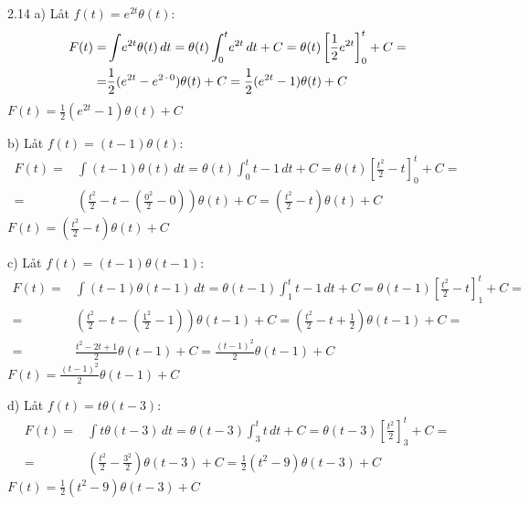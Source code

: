 \begin{task}{2.14 a)}
	Låt $f(t)=e^{2t}\theta(t)$:
	\begin{align*}
	F(t)=
	&\int \! e^{2t}\theta(t) \, dt=
	\theta(t)\int_{0}^{t} \! e^{2t} \, dt+C=
	\theta(t)\left[\frac{1}{2}e^{2t}\right]_{0}^{t}+C= \\ =
	&\frac{1}{2}(e^{2t}-e^{2\operatorname{\cdot}0})\theta(t)+C=
	\frac{1}{2}(e^{2t}-1)\theta(t)+C
	\end{align*}
	\ans $F(t)=\frac{1}{2}(e^{2t}-1)\theta(t)+C$
\end{task}

\begin{task}{b)}
	Låt $f(t)=(t-1)\theta(t)$:
	\begin{align*}
	F(t)=
	&\int \! (t-1)\theta(t) \, dt=
	\theta(t)\int_{0}^{t} \! t-1 \, dt+C=
	\theta(t)\left[\frac{t^2}{2}-t\right]_{0}^{t}+C= \\ =
	&\left(\frac{t^2}{2}-t-\left(\frac{0^2}{2}-0\right)\right)\theta(t)+C=
	\left(\frac{t^2}{2}-t\right)\theta(t)+C
	\end{align*}
	\ans $F(t)=(\frac{t^2}{2}-t)\theta(t)+C$
\end{task}

\begin{task}{c)}
	Låt $f(t)=(t-1)\theta(t-1)$:
	\begin{align*}
	F(t)=
	&\int \! (t-1)\theta(t-1) \, dt=
	\theta(t-1)\int_{1}^{t} \! t-1 \, dt+C=
	\theta(t-1)\left[\frac{t^2}{2}-t\right]_{1}^{t}+C= \\ =
	&\left(\frac{t^2}{2}-t-\left(\frac{1^2}{2}-1\right)\right)\theta(t-1)+C=
	\left(\frac{t^2}{2}-t+\frac{1}{2}\right)\theta(t-1)+C= \\ =
	&\frac{t^2-2t+1}{2}\theta(t-1)+C=
	\frac{(t-1)^2}{2}\theta(t-1)+C
	\end{align*}
	\ans $F(t)=\frac{(t-1)^2}{2}\theta(t-1)+C$
\end{task}

\begin{task}{d)}
	Låt $f(t)=t\theta(t-3)$:
	\begin{align*}
	F(t)=
	&\int \! t\theta(t-3) \, dt=
	\theta(t-3)\int_{3}^{t} \! t \, dt+C=
	\theta(t-3)\left[\frac{t^2}{2}\right]_{3}^{t}+C= \\ =
	&\left(\frac{t^2}{2}-\frac{3^2}{2}\right)\theta(t-3)+C=
	\frac{1}{2}\left(t^2-9\right)\theta(t-3)+C
	\end{align*}
	\ans $F(t)=\frac{1}{2}\left(t^2-9\right)\theta(t-3)+C$
\end{task}